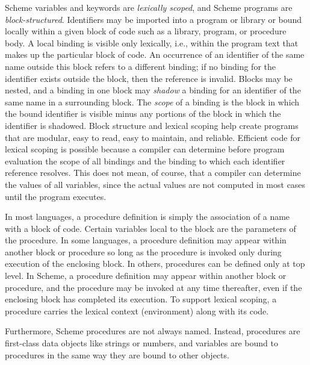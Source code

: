 Scheme variables and keywords are
\label{intro_s12}\textit{lexically scoped}, and
Scheme programs are
\label{intro_s13}\textit{block-structured}.
Identifiers may be imported into a program or library or bound locally
within a given block of code such as a library, program, or procedure
body.
A local \label{intro_s14}binding is visible only lexically, i.e., within the program text
that makes up the particular block of code.
An occurrence of an identifier of the same name outside this block
refers to a different binding; if no binding for the identifier
exists outside
the block, then the reference is invalid.
Blocks may be nested, and a binding in
one block may \label{intro_s15}\textit{shadow} a binding for an identifier
of the same name in a surrounding block.
The \textit{scope} of a binding is the block in which the bound identifier
is visible
minus any portions of the block in which the identifier is
shadowed.
Block structure and lexical scoping help create
programs that are
modular, easy to read, easy to maintain, and reliable.
Efficient code for lexical scoping is possible because a compiler
can determine before program evaluation the scope of all bindings
and the binding to which each identifier reference resolves.
This does not mean, of course, that a compiler can determine the
values of all variables, since the actual values are not computed
in most cases until the program executes.


In most languages, a \label{intro_s16}procedure definition is simply the association
of a name with a block of code.
Certain variables local to the block are the parameters of the
procedure.
In some languages, a procedure definition may appear within another
block or procedure so long as the procedure is invoked only during
execution of the enclosing block.
In others, procedures can be defined only at top level.
In Scheme, a procedure definition may appear within another block or
procedure, and the procedure may be invoked at any time thereafter,
even if the enclosing block has completed its execution.
To support \label{intro_s17}lexical scoping, a procedure carries the lexical context
(environment) along with its code.


Furthermore, Scheme procedures are not always named.
Instead, procedures are \label{intro_s18}first-class data
objects like strings
or numbers, and variables are bound to procedures in the same way they
are bound to other objects.


